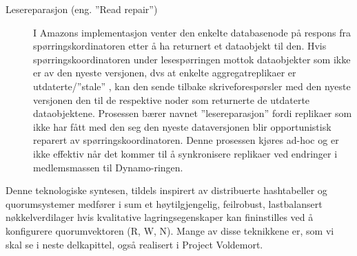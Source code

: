 \begin{description}
  \item [Lesereparasjon (eng. ''Read repair'')] I Amazons implementasjon venter den enkelte databasenode på respons fra spørringskordinatoren etter å ha returnert et dataobjekt til den. Hvis spørringskoordinatoren under lesespørringen mottok dataobjekter som ikke er av den nyeste versjonen, dvs at enkelte aggregatreplikaer er utdaterte/''stale'' \citep{decandia2007}, kan den sende tilbake skriveforespørsler med den nyeste versjonen den til de respektive noder som returnerte de utdaterte dataobjektene. Prosessen bærer navnet ''lesereparasjon'' fordi replikaer som ikke har fått med den seg den nyeste dataversjonen blir opportunistisk reparert av spørringskoordinatoren. Denne prosessen kjøres ad-hoc og er ikke effektiv når det kommer til å synkronisere replikaer ved endringer i medlemsmassen til Dynamo-ringen.
\end{description}

Denne teknologiske syntesen, tildels inspirert av distribuerte hashtabeller og quorumsystemer medfører i sum et høytilgjengelig, feilrobust, lastbalansert nøkkelverdilager hvis kvalitative lagringsegenskaper kan fininstilles ved å konfigurere quorumvektoren (R, W, N). Mange av disse teknikkene er, som vi skal se i neste delkapittel, også realisert i Project Voldemort.
